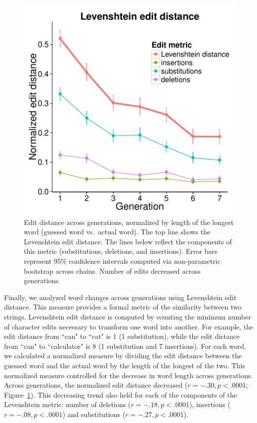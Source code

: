 \begin{figure}[t!]
\begin{center}
\includegraphics[width = .6\linewidth]{figs/lev.pdf}
\end{center}
\caption{Edit distance across generations, normalized by length of the longest word (guessed word vs.\ actual word). The top line shows the Levenshtein edit distance. The lines below reflect the components of this metric (substitutions, deletions, and insertions). Error bars represent 95\% confidence intervals computed via non-parametric bootstrap across chains. Number of edits decreased across generations.}
\label{fig:lev}
\end{figure}




Finally, we analyzed word changes across generations using Levenshtein edit distance. This measure provides a formal metric of the similarity between two strings. Levenshtein edit distance is computed by counting the minimum number of character edits necessary to transform one word into another. For example, the edit distance from ``can" to ``cat" is 1 (1 substitution), while the edit distance from ``can" to ``calculator" is 8 (1 substitution and 7 insertions). For each word, we calculated a normalized measure by dividing the edit distance between the guessed word and the actual word by the length of the longest of the two. This normalized measure controlled for the decrease in word length across generations.  Across generations, the normalized edit distance decreased ($r=-.30, p<.0001$; Figure\ \ref{fig:lev}). This decreasing trend also held for each of the components of the Levenshtein metric: number of deletions ($r=-.18, p<.0001$), insertions ($r=-.08, p<.0001$) and substitutions ($r=-.27, p<.0001$). 

